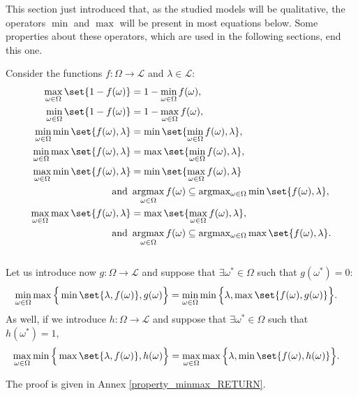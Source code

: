 This section just introduced that,
as the studied models will be qualitative,
the operators $\min$ and $\max$
will be present in most equations below.
Some properties about these operators,
which are used in the following sections, 
end this one.
\newpage
\begin{Property}
\label{property_minmax}
Consider the functions $f: \Omega \rightarrow \mathcal{L}$ and $\lambda \in \mathcal{L}$:
\begin{align}
\label{equationmaxmin1} \max_{\omega \in \Omega} \set{ 1 - f(\omega) } &= 1 - \min_{\omega \in \Omega} f(\omega), \\
\label{equationmaxmin2} \min_{\omega \in \Omega} \set{ 1 - f(\omega) } &= 1 - \max_{\omega \in \Omega} f(\omega), \\
\label{equationmaxmin5} \min_{\omega \in \Omega} \min \set{ f(\omega), \lambda } &= \min \set{ \min_{\omega \in \Omega} f(\omega), \lambda }, \\
\label{equationmaxmin4} \min_{\omega \in \Omega} \max \set{ f(\omega), \lambda } &= \max \set{ \min_{\omega \in \Omega} f(\omega), \lambda }, \\
\label{equationmaxmin3} \max_{\omega \in \Omega} \min \set{ f(\omega), \lambda } &= \min \set{ \max_{\omega \in \Omega} f(\omega), \lambda } \\
\label{equationargmax1} \mbox{ and } & \operatorname*{argmax}_{\omega \in \Omega} f(\omega) \subseteq \operatorname*{argmax_{\omega \in \Omega}} \min \set{ f(\omega), \lambda },\\
\label{equationmaxmin6} \max_{\omega \in \Omega} \max \set{ f(\omega), \lambda } &= \max \set{ \max_{\omega \in \Omega} f(\omega), \lambda },\\
\label{equationargmax2} \mbox{ and } & \operatorname*{argmax}_{\omega \in \Omega} f(\omega) \subseteq \operatorname*{argmax_{\omega \in \Omega}} \max \set{ f(\omega), \lambda }. 
\end{align}
\\
Let us introduce now $g:\Omega \rightarrow \mathcal{L}$ and suppose that $\exists \omega^* \in \Omega$
such that $g(\omega^*)=0$:
\begin{align}
\label{equationmaxmin7} \min_{\omega \in \Omega} \max \Big\{ \min \set{ \lambda, f(\omega) }, g(\omega) \Big\} &= \min_{\omega \in \Omega} \min \Big\{ \lambda, \max \set{ f(\omega), g(\omega)} \Big\}.
\end{align}
As well, if we introduce $h:\Omega \rightarrow \mathcal{L}$ and 
suppose that $\exists \omega^* \in \Omega$
such that $h(\omega^*)=1$,
\begin{align}
\label{equationmaxmin8} \max_{\omega \in \Omega} \min \Big\{ \max \set{ \lambda, f(\omega) }, h(\omega) \Big\} &= \max_{\omega \in \Omega} \max \Big\{ \lambda, \min \set{ f(\omega), h(\omega)} \Big\}.
\end{align}
\end{Property}
The proof is given in Annex \ref{property_minmax_RETURN}.

